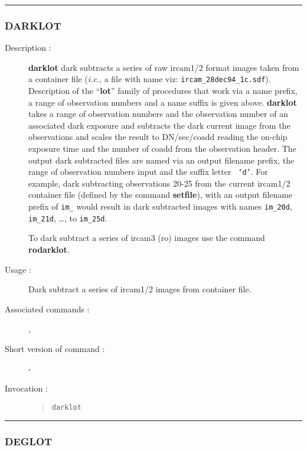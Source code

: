 \hrule 
\subsubsection*{\label{DARKLOT}DARKLOT}

\begin{description}

\item[Description :] {\bf darklot} dark subtracts a series of raw {\sc
ircam1/2} format images taken from a container file (\emph{i.e.}, a
file with name viz:  {\tt ircam\_28dec94\_1c.sdf}).  Description of the
``{\bf lot}'' family of procedures that work via a name prefix, a range
of observation numbers and a name suffix is given above.  {\bf darklot}
takes a range of observation numbers and the observation number of an
associated dark exposure and subtracts the dark current image from the
observations and scales the result to DN/sec/coadd reading the on-chip
exposure time and the number of coadd from the observation header.  The
output dark subtracted files are named via an output filename prefix,
the range of observation numbers input and the suffix letter {\tt
`d'}.  For example, dark subtracting observations 20-25 from the
current {\sc ircam1/2} container file (defined by the command {\bf
setfile}), with an output filename prefix of {\tt im\_} would result in
dark subtracted images with names {\tt im\_20d}, {\tt im\_21d}, \ldots,
to {\tt im\_25d}.

To dark subtract a series of {\sc ircam3} ({\sc ro}) images use the command
{\bf rodarklot}.

\item[Usage :] Dark subtract a series of {\sc ircam1/2} images from 
container file.
\item[Associated commands :] {\tt {}}, 
{\tt {}}
\item[Short version of command :] -
\item[Invocation :]

\begin{quote}{\tt  darklot }\end{quote}

\end{description}

\hrule 
\subsubsection*{\label{DEGLOT}DEGLOT}

